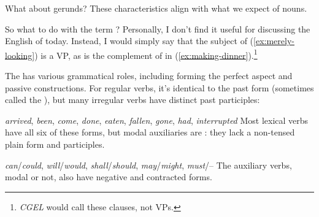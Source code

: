 \begin{tblsframed}{What about gerunds?}
\indent These characteristics align with what we expect of nouns.

\indent So what to do with the term ? Personally, I don't find it useful for discussing the English of today. Instead, I would simply say that the subject of  (\ref{ex:merely-looking}) is a VP, as is the complement of  in (\ref{ex:making-dinner}).\footnote{\textit{CGEL} would call these clauses, not VPs.}

\end{tblsframed}

The  has various grammatical roles, including forming the perfect aspect and passive constructions. For regular verbs, it's identical to the past form (sometimes called the ), but many irregular verbs have distinct past participles:

\ea \emph{arrived}, \emph{been}, \emph{come}, \emph{done}, \emph{eaten}, \emph{fallen}, \emph{gone}, \emph{had}, \emph{interrupted}\label{ex:past-participles}
\z
Most lexical verbs have all six of these forms, but modal auxiliaries are : they lack a non-tensed plain form and participles.\label{sec:defective-modals}

\ea \emph{can}/\emph{could}, \emph{will}/\emph{would}, \emph{shall}/\emph{should}, \emph{may}/\emph{might}, \emph{must}/--
\z
\noindent The auxiliary verbs, modal or not, also have negative and contracted forms.

